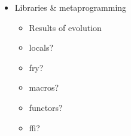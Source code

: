 \begin{itemize}
\item Libraries \& metaprogramming
      \begin{itemize}
        \item Results of evolution
        \item locals?
        \item fry?
        \item macros?
        \item functors?
        \item ffi?
      \end{itemize}

\end{itemize}


